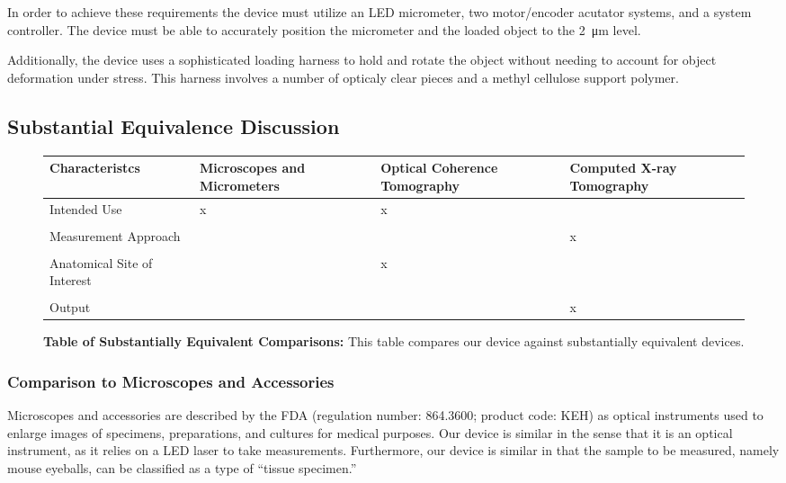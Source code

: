 \documentclass{article}
\begin{document}
In order to achieve these requirements the device must utilize an LED
micrometer, two motor/encoder acutator systems, and a system
controller. The device must be able to accurately position the
micrometer and the loaded object to the \SI{2}{\micro m} level.

Additionally, the device uses a sophisticated loading harness to hold
and rotate the object without needing to account for object
deformation under stress. This harness involves a number of opticaly
clear pieces and a methyl cellulose support polymer.
\subsection{Substantial Equivalence Discussion}

\begin{figure}[H]
  \begin{tabularx}{\textwidth}{YYYY}
    \toprule
    Characteristcs & \mbox{Microscopes} and \mbox{Micrometers} & Optical Coherence \mbox{Tomography} & Computed X-ray \mbox{Tomography} \\ 
    \hline
    Intended Use & x & x &  \\
    \\
    Measurement Approach &   &  & x \\ 
    \\
    Anatomical Site of Interest & & x &  \\
    \\
    Output & & & x \\
    \bottomrule
  \end{tabularx}
  \caption{\textbf{Table of Substantially Equivalent Comparisons:}
    This table compares our device against substantially equivalent
    devices.}
\end{figure}

\subsubsection{Comparison to Microscopes and Accessories}
Microscopes and accessories are described by the FDA (regulation
number: 864.3600; product code: KEH) as optical instruments used to
enlarge images of specimens, preparations, and cultures for medical
purposes. Our device is similar in the sense that it is an optical
instrument, as it relies on a LED laser to take
measurements. Furthermore, our device is similar in that the sample to
be measured, namely mouse eyeballs, can be classified as a type of
``tissue specimen.''
\end{document}
